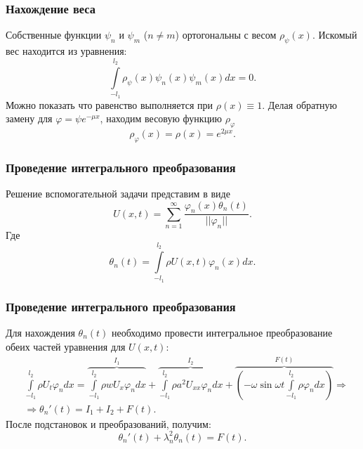 \documentclass[10pt,pdf,hyperref={unicode}]{beamer}
\begin{document}
\begin{frame}
  \frametitle{Нахождение веса}
  Собственные функции $\psi_n$ и $\psi_m$ ($n \ne m$) ортогональны с весом $\rho_\psi(x)$. Искомый вес находится из уравнения:
  \begin{equation*}
    \int \limits_{-l_1}^{l_2} \rho_\psi(x) \psi_n(x) \psi_m(x) dx = 0.
  \end{equation*}
  Можно показать что равенство выполняется при $\rho(x) \equiv 1$.
  Делая обратную замену для $\varphi = \psi e^{-\mu x}$, находим весовую функцию $\rho_\varphi$
  \begin{equation*}
    \rho_\varphi(x) = \rho(x) = e^{2 \mu x}.
  \end{equation*}
\end{frame}

\begin{frame}
  \frametitle{Проведение интегрального преобразования}
  Решение вспомогательной задачи представим в виде
  \begin{equation*}
    U(x,t)=\sum \limits_{n=1}^{\infty} \frac{\varphi_n(x) \theta_n(t)}{||\varphi_n||}.
  \end{equation*}
  Где
  \begin{equation*}
    \theta_n(t) = \int \limits_{-l_1}^{l_2} \rho U(x,t) \varphi_n(x) dx.
  \end{equation*}
\end{frame}

\begin{frame}
  \frametitle{Проведение интегрального преобразования}
  Для нахождения $\theta_n(t)$ необходимо провести интегральное преобразование обеих частей уравнения для $U(x,t)$:
  \begin{equation*}
    \begin{aligned}
      & \int \limits_{-l_1}^{l_2} \rho U_t \varphi_n dx = \overbrace{\int \limits_{-l_1}^{l_2} \rho w U_x \varphi_n dx}^{I_1} + \overbrace{\int \limits_{-l_1}^{l_2} \rho a^2 U_{xx} \varphi_n dx}^{I_2} +  \overbrace{\left( -\omega \sin \omega t \int \limits_{-l_1}^{l_2} \rho \varphi_n dx \right)}^{F(t)}  \Rightarrow \\
    & \Rightarrow \theta_n'(t) = I_1 + I_2 + F(t).
  \end{aligned}
  \end{equation*}
  После подстановок и преобразований, получим:
  \begin{equation*}
  \theta_n'(t) + \lambda_n^2 \theta_n(t) = F(t).
  \end{equation*}

\end{frame}
\end{document}
